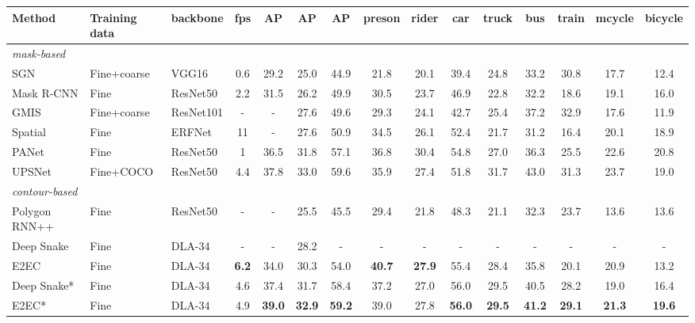 \documentclass[10pt,twocolumn,letterpaper]{article}
\begin{document}
\begin{table*}[t]
\begin{minipage}[c]{0.75\linewidth}
\centering
  \setlength{\tabcolsep}{0.35mm}
  \begin{footnotesize}
  \begin{tabular}{l|l|l|cc c c c c c c c c c c}
    Method & Training data & backbone & fps & AP & AP & AP & preson & rider & car & truck & bus & train & mcycle & bicycle\\
    \hline
    \emph{mask-based} &&&&&&&&&&&&&&\\
    SGN \cite{sgn} & Fine+coarse & VGG16 & 0.6 & 29.2 & 25.0 & 44.9 & 21.8 & 20.1 & 39.4 & 24.8 & 33.2 & 30.8 & 17.7 & 12.4 \\
    Mask R-CNN \cite{maskrcnn} & Fine & ResNet50 & 2.2 & 31.5 & 26.2 & 49.9 & 30.5 & 23.7 & 46.9 & 22.8 & 32.2 & 18.6 & 19.1& 16.0 \\
    GMIS \cite{gmis} & Fine+coarse & ResNet101 & - & - & 27.6 & 49.6 & 29.3 & 24.1 & 42.7 & 25.4 & 37.2 & 32.9 & 17.6 & 11.9 \\
    Spatial \cite{spatial} & Fine & ERFNet & 11 & - & 27.6 & 50.9 & 34.5 & 26.1 & 52.4 & 21.7	 & 31.2 & 16.4 & 20.1 & 18.9 \\
    PANet \cite{panet} & Fine & ResNet50 & 1 & 36.5 & 31.8 & 57.1 & 36.8 & 30.4 & 54.8 & 27.0 & 36.3 & 25.5 & 22.6 & 20.8 \\
    UPSNet \cite{upsnet} & Fine+COCO& ResNet50 & 4.4 & 37.8 & 33.0 & 59.6 & 35.9 & 27.4 & 51.8 & 31.7 & 43.0 & 31.3 & 23.7 & 19.0 \\
    \hline
    \emph{contour-based} &&&&&&&&&&&&&&\\
    Polygon RNN++ \cite{polygonrnn} & Fine & ResNet50 & - & - & 25.5 & 45.5 & 29.4 & 21.8 & 48.3 & 21.1 & 32.3 & 23.7 & 13.6 & 13.6 \\
    Deep Snake \cite{deepsnake} & Fine & DLA-34 & - & -& 28.2 & - & - & - & - & - & - & - & - & - \\
    E2EC & Fine & DLA-34 & \textbf{6.2} & 34.0 & 30.3 & 54.0 & \textbf{40.7} & \textbf{27.9} & 55.4 & 28.4 & 35.8 & 20.1 & 20.9 & 13.2 \\
    Deep Snake* \cite{deepsnake} & Fine & DLA-34 & 4.6 & 37.4 & 31.7 & 58.4 & 37.2 & 27.0 & 56.0 & 29.5 & 40.5 & 28.2 & 19.0 & 16.4 \\
    E2EC* & Fine & DLA-34 & 4.9 & \textbf{39.0} & \textbf{32.9} & \textbf{59.2} & 39.0 & 27.8 & \textbf{56.0} & \textbf{29.5} & \textbf{41.2} & \textbf{29.1} & \textbf{21.3} & \textbf{19.6} \\
  \end{tabular}\vspace{-3mm}

\end{footnotesize}
\end{minipage}
\end{table*}
\end{document}
